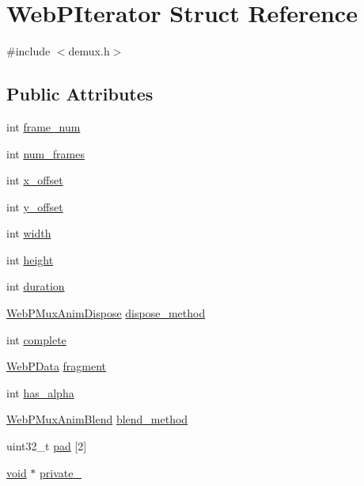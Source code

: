 \hypertarget{struct_web_p_iterator}{}\section{Web\+P\+Iterator Struct Reference}
\label{struct_web_p_iterator}


{\ttfamily \#include $<$demux.\+h$>$}

\subsection*{Public Attributes}
\begin{DoxyCompactItemize}
\item 
int \mbox{\hyperlink{struct_web_p_iterator_ad2b5cf78971b868cd0e1d3c361c3719f}{frame\+\_\+num}}
\item 
int \mbox{\hyperlink{struct_web_p_iterator_a2740a6c72c27ed33daa3674f361489ab}{num\+\_\+frames}}
\item 
int \mbox{\hyperlink{struct_web_p_iterator_a5cdafa3ad6bedc0f8eb47388f4361c75}{x\+\_\+offset}}
\item 
int \mbox{\hyperlink{struct_web_p_iterator_a35d39245b3c9b8ddb2eb058bec827dbb}{y\+\_\+offset}}
\item 
int \mbox{\hyperlink{struct_web_p_iterator_a0762ef1f2998664111ed0cf814008dd4}{width}}
\item 
int \mbox{\hyperlink{struct_web_p_iterator_a020f28930a5d971bbbc09706c07bfb52}{height}}
\item 
int \mbox{\hyperlink{struct_web_p_iterator_aa023f08493f26ccc06c90b56d0c2cb45}{duration}}
\item 
\mbox{\hyperlink{mux__types_8h_a8ff0ce53be803f477f12121687fd517f}{Web\+P\+Mux\+Anim\+Dispose}} \mbox{\hyperlink{struct_web_p_iterator_a14ab4460c7f6af2f92251f12acc7e9ce}{dispose\+\_\+method}}
\item 
int \mbox{\hyperlink{struct_web_p_iterator_a62cf0395666877963857853e64a775fe}{complete}}
\item 
\mbox{\hyperlink{struct_web_p_data}{Web\+P\+Data}} \mbox{\hyperlink{struct_web_p_iterator_a59a5f135561e2ad52a32e25886dbd164}{fragment}}
\item 
int \mbox{\hyperlink{struct_web_p_iterator_a89b14b410bcb042d7621d4b5cfb5b540}{has\+\_\+alpha}}
\item 
\mbox{\hyperlink{mux__types_8h_aa954e5371fe03449cc23ae851b689456}{Web\+P\+Mux\+Anim\+Blend}} \mbox{\hyperlink{struct_web_p_iterator_af20f667aab5d6bd7167d813282bee213}{blend\+\_\+method}}
\item 
uint32\+\_\+t \mbox{\hyperlink{struct_web_p_iterator_a6e288ad78e9c3f077193f215f90a4893}{pad}} \mbox{[}2\mbox{]}
\item 
\mbox{\hyperlink{_s_d_l__opengles2__gl2ext_8h_ae5d8fa23ad07c48bb609509eae494c95}{void}} $\ast$ \mbox{\hyperlink{struct_web_p_iterator_a07a320cffb5b21dca370a60428944a7b}{private\+\_\+}}
\end{DoxyCompactItemize}


